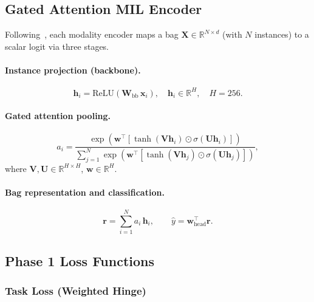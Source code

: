 \documentclass[11pt,a4paper]{article}
\begin{document}
\subsection{Gated Attention MIL Encoder}
\label{sec:abmil}

Following~\cite{ilse2018abmil}, each modality encoder maps a bag
$\mathbf{X}\in\mathbb{R}^{N\times d}$ (with $N$ instances) to a scalar logit
via three stages.

\paragraph{Instance projection (backbone).}
\begin{equation}
    \mathbf{h}_i = \text{ReLU}\!\left(\mathbf{W}_\text{bb}\,\mathbf{x}_i\right),
    \quad \mathbf{h}_i \in \mathbb{R}^H, \quad H=256.
\end{equation}

\paragraph{Gated attention pooling.}
\begin{equation}
    a_i = \frac{\exp\!\left(\mathbf{w}^\top
          \!\left[\tanh(\mathbf{V}\mathbf{h}_i)
                 \odot\sigma(\mathbf{U}\mathbf{h}_i)\right]\right)}
         {\sum_{j=1}^{N}\exp\!\left(\mathbf{w}^\top
          \!\left[\tanh(\mathbf{V}\mathbf{h}_j)
                 \odot\sigma(\mathbf{U}\mathbf{h}_j)\right]\right)},
    \label{eq:abmil}
\end{equation}
where $\mathbf{V},\mathbf{U}\in\mathbb{R}^{H\times H}$,
$\mathbf{w}\in\mathbb{R}^H$.

\paragraph{Bag representation and classification.}
\begin{equation}
    \mathbf{r} = \sum_{i=1}^{N} a_i\,\mathbf{h}_i, \qquad
    \hat{y} = \mathbf{w}_\text{head}^\top \mathbf{r}.
    \label{eq:rep}
\end{equation}

\subsection{Phase 1 Loss Functions}

\subsubsection{Task Loss (Weighted Hinge)}
\end{document}
